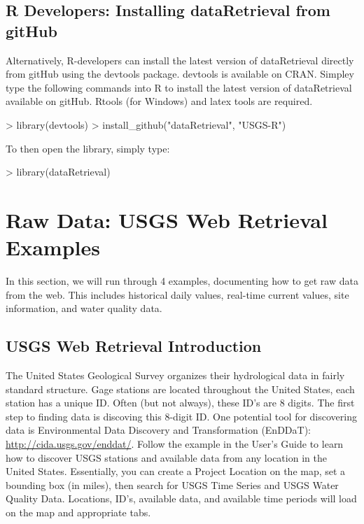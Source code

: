 \documentclass[a4paper,11pt]{article}
\begin{document}
\subsection{R Developers: Installing dataRetrieval from gitHub}
Alternatively, R-developers can install the latest version of dataRetrieval directly from gitHub using the devtools package.  devtools is available on CRAN.  Simpley type the following commands into R to install the latest version of dataRetrieval available on gitHub.  Rtools (for Windows) and latex tools are required.

\begin{Schunk}
\begin{Sinput}
> library(devtools)
> install_github("dataRetrieval", "USGS-R")
\end{Sinput}
\end{Schunk}
To then open the library, simply type:

\begin{Schunk}
\begin{Sinput}
> library(dataRetrieval)
\end{Sinput}
\end{Schunk}

\newpage
\section{Raw Data: USGS Web Retrieval Examples}
In this section, we will run through 4 examples, documenting how to get raw data from the web. This includes historical daily values, real-time current values, site information, and water quality data. 
\subsection{USGS Web Retrieval Introduction}
The United States Geological Survey organizes their hydrological data in fairly standard structure.  Gage stations are located throughout the United States, each station has a unique ID.  Often (but not always), these ID's are 8 digits.  The first step to finding data is discoving this 8-digit ID. One potential tool for discovering data is Environmental Data Discovery and Transformation (EnDDaT): \url{http://cida.usgs.gov/enddat/}.  Follow the example in the User's Guide to learn how to discover USGS stations and available data from any location in the United States. Essentially, you can create a Project Location on the map, set a bounding box (in miles), then search for USGS Time Series and USGS Water Quality Data. Locations, ID's, available data, and available time periods will load on the map and appropriate tabs.
\end{document}
